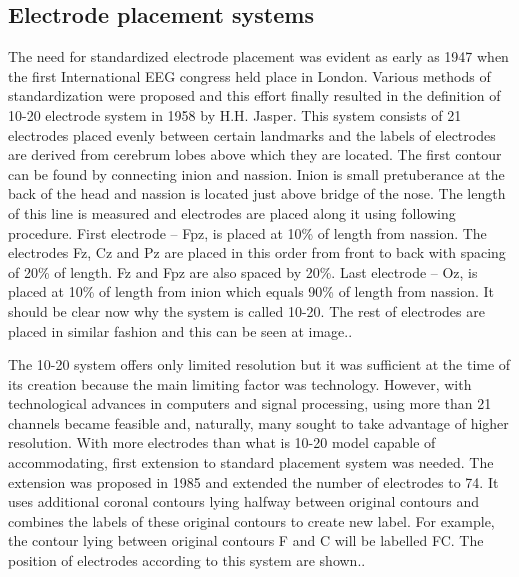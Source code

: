 \subsection{Electrode placement systems}
The need for standardized electrode placement was evident as early as 1947 when
the first International EEG congress held place in London. Various methods of
standardization were proposed and this effort finally resulted in the definition
of 10-20 electrode system in 1958 by H.H. Jasper. \cite{placeSys} 
This system consists of 21 electrodes placed evenly between certain landmarks
and the labels of electrodes are derived from cerebrum lobes above which they
are located. The first contour can be found by connecting inion and nassion.
Inion is small pretuberance at the back of the head and nassion is located just
above bridge of the nose. The length of this line is measured and electrodes are
placed along it using following procedure. First electrode -- Fpz, is placed at
10\% of length from nassion. The electrodes Fz, Cz and Pz are placed in this
order from front to back with spacing of 20\% of length. Fz and Fpz are also
spaced by 20\%. Last electrode -- Oz, is placed at 10\% of length from inion
which equals 90\% of length from nassion. It should be clear now why the system
is called 10-20. The rest of electrodes are placed in similar fashion and this
can be seen at image.. %

The 10-20 system offers only limited resolution but it was sufficient at the
time of its creation because the main limiting factor was technology. However,
with technological advances in computers and signal processing, using more than
21 channels became feasible and, naturally, many sought to take advantage of
higher resolution. With more electrodes than what is 10-20 model capable of
accommodating, first extension to standard placement system was needed. The
extension was proposed in 1985 and extended the number of electrodes to 74. It
uses additional coronal contours lying halfway between original contours and
combines the labels of these original contours to create new label. For example,
the contour lying between original contours F and C will be labelled FC.
\cite{placeSys} The position of electrodes according to this system are shown..


